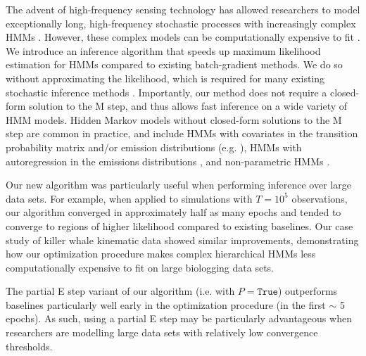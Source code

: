 
The advent of high-frequency sensing technology has allowed researchers to model exceptionally long, high-frequency stochastic processes with increasingly complex HMMs \citep{Patterson:2017}. However, these complex models can be computationally expensive to fit \citep{Glennie:2023}.
We introduce an inference algorithm that speeds up maximum likelihood estimation for HMMs compared to existing batch-gradient methods. We do so without approximating the likelihood, which is required for many existing stochastic inference methods \citep{Gotoh:1998,Ye:2017}. Importantly, our method does not require a closed-form solution to the M step, and thus allows fast inference on a wide variety of HMM models. Hidden Markov models without closed-form solutions to the M step are common in practice, and include HMMs with covariates in the transition probability matrix and/or emission distributions (e.g. \citet{Pirotta:2018}), HMMs with autoregression in the emissions distributions \citep{Lawler:2019}, and non-parametric HMMs \citep{Langrock:2018}.

Our new algorithm was particularly useful when performing inference over large data sets. For example, when applied to simulations with $T=10^{5}$ observations, our algorithm converged in approximately half as many epochs and tended to converge to regions of higher likelihood compared to existing baselines. Our case study of killer whale kinematic data showed similar improvements, demonstrating how our optimization procedure makes complex hierarchical HMMs less computationally expensive to fit on large biologging data sets.

The partial E step variant of our algorithm (i.e. with $P = \texttt{True}$) outperforms baselines particularly well early in the optimization procedure (in the first $\sim$ 5 epochs). As such, using a partial E step may be particularly advantageous when researchers are modelling large data sets with relatively low convergence thresholds.

